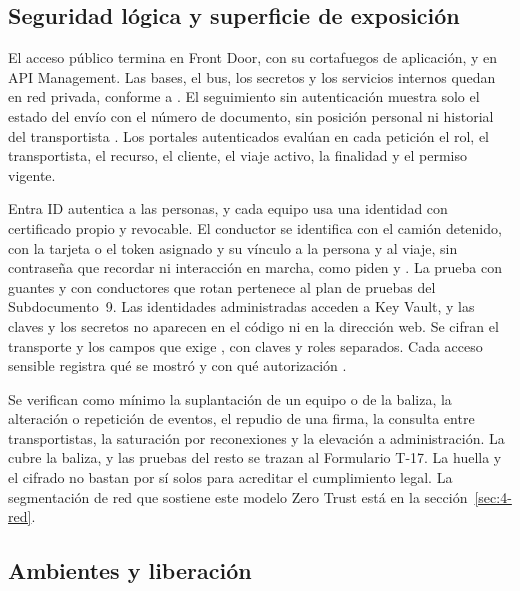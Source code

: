\subsection{Seguridad lógica y superficie de exposición}\label{sec:4-seguridad}

El acceso público termina en Front Door, con su cortafuegos de aplicación, y en API Management. Las
bases, el bus, los secretos y los servicios internos quedan en red privada, conforme a
. El seguimiento sin autenticación muestra solo el estado del envío con el número
de documento, sin posición personal ni historial del transportista . Los portales
autenticados evalúan en cada petición el rol, el transportista, el recurso, el cliente, el viaje activo,
la finalidad y el permiso vigente.

Entra ID autentica a las personas, y cada equipo usa una identidad con certificado propio y revocable.
El conductor se identifica con el camión detenido, con la tarjeta o el token asignado y su vínculo a la
persona y al viaje, sin contraseña que recordar ni interacción en marcha, como piden
 y . La prueba con guantes y con conductores que rotan pertenece
al plan de pruebas del Subdocumento~9. Las identidades administradas acceden a Key Vault, y las claves y
los secretos no aparecen en el código ni en la dirección web. Se cifran el transporte y los campos que
exige , con claves y roles separados. Cada acceso sensible registra qué se mostró y
con qué autorización .

Se verifican como mínimo la suplantación de un equipo o de la baliza, la alteración o repetición de
eventos, el repudio de una firma, la consulta entre transportistas, la saturación por reconexiones y la
elevación a administración. La  cubre la baliza, y las pruebas del resto se trazan al
Formulario T-17. La huella y el cifrado no bastan por sí solos para acreditar el cumplimiento legal. La segmentación de red que sostiene este modelo Zero Trust está en la
sección~\ref{sec:4-red}.

\subsection{Ambientes y liberación}\label{sec:4-liberacion}

